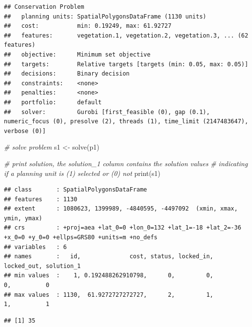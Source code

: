 \documentclass[
  12pt,
]{book}
\newenvironment{Shaded}{\begin{snugshade}}{\end{snugshade}}
\newcommand{\CommentTok}[1]{\textcolor[rgb]{0.56,0.35,0.01}{\textit{#1}}}
\newcommand{\FunctionTok}[1]{\textcolor[rgb]{0.00,0.00,0.00}{#1}}
\newcommand{\NormalTok}[1]{#1}
\newcommand{\OtherTok}[1]{\textcolor[rgb]{0.56,0.35,0.01}{#1}}
\newcommand{\SpecialCharTok}[1]{\textcolor[rgb]{0.00,0.00,0.00}{#1}}
\begin{document}
\begin{verbatim}
## Conservation Problem
##   planning units: SpatialPolygonsDataFrame (1130 units)
##   cost:           min: 0.19249, max: 61.92727
##   features:       vegetation.1, vegetation.2, vegetation.3, ... (62 features)
##   objective:      Minimum set objective 
##   targets:        Relative targets [targets (min: 0.05, max: 0.05)]
##   decisions:      Binary decision 
##   constraints:    <none>
##   penalties:      <none>
##   portfolio:      default
##   solver:         Gurobi [first_feasible (0), gap (0.1), numeric_focus (0), presolve (2), threads (1), time_limit (2147483647), verbose (0)]
\end{verbatim}

\begin{Shaded}
\begin{Highlighting}[]
\CommentTok{\# solve problem}
\NormalTok{s1 }\OtherTok{\textless{}{-}} \FunctionTok{solve}\NormalTok{(p1)}

\CommentTok{\# print solution, the solution\_1 column contains the solution values}
\CommentTok{\# indicating if a planning unit is (1) selected or (0) not}
\FunctionTok{print}\NormalTok{(s1)}
\end{Highlighting}
\end{Shaded}

\begin{verbatim}
## class       : SpatialPolygonsDataFrame 
## features    : 1130 
## extent      : 1080623, 1399989, -4840595, -4497092  (xmin, xmax, ymin, ymax)
## crs         : +proj=aea +lat_0=0 +lon_0=132 +lat_1=-18 +lat_2=-36 +x_0=0 +y_0=0 +ellps=GRS80 +units=m +no_defs 
## variables   : 6
## names       :   id,              cost, status, locked_in, locked_out, solution_1 
## min values  :    1, 0.192488262910798,      0,         0,          0,          0 
## max values  : 1130,  61.9272727272727,      2,         1,          1,          1
\end{verbatim}

\begin{Shaded}
\end{Shaded}

\begin{verbatim}
## [1] 35
\end{verbatim}
\end{document}
